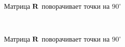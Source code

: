 \begin{frame}
    
    \vspace{2em}
    \begin{figure}
       \begin{center}
        \caption{Матрица $\mathbf R$ поворачивает точки на $90^{\circ}$}
       \end{center}
    \end{figure}

\end{frame}


\begin{frame}
    \
    \vspace{2em}
    \begin{figure}
       \begin{center}
        \caption{Матрица $\mathbf R$ поворачивает точки на $90^{\circ}$}
       \end{center}
    \end{figure}

\end{frame}

